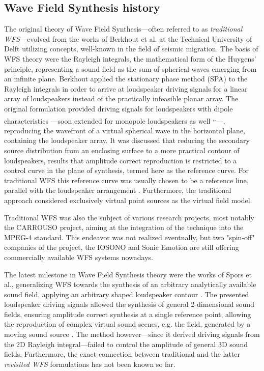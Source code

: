 \documentclass[10pt,twoside]{article}
\theoremstyle{thesisgroupstyle}
\begin{document}
\subsection{Wave Field Synthesis history}
%
The original theory of Wave Field Synthesis---often referred to as \emph{traditional WFS}---evolved from the works of Berkhout et al. at the Technical University of Delft utilizing concepts, well-known in the field of seismic migration.%
The basis of WFS theory were the Rayleigh integrals, the mathematical form of the Huygens' principle, representing a sound field as the sum of spherical waves emerging from an infinite plane.
Berkhout applied the stationary phase method (SPA) to the Rayleigh integrals in order to arrive at loudspeaker driving signals for a linear array of loudspeakers instead of the practically infeasible planar array.
The original formulation provided driving signals for loudspeakers with dipole characteristics ---soon extended for monopole loudspeakers as well \textsuperscript{,}\textsuperscript{,}---, reproducing the wavefront of a virtual spherical wave in the horizontal plane, containing the loudspeaker array.
It was discussed that reducing the secondary source distribution from an enclosing surface to a more practical contour of loudspeakers, results that amplitude correct reproduction is restricted to a control curve in the plane of synthesis, termed here as the reference curve.
For traditional WFS this reference curve was usually chosen to be a reference line, parallel with the loudspeaker arrangement .
Furthermore, the traditional approach considered exclusively virtual point sources as the virtual field model.

Traditional WFS was also the subject of various research projects, most notably the CARROUSO project, aiming at the integration of the technique into the MPEG-4 standard. This endeavor was not realized eventually, but two "spin-off" companies of the project, the IOSONO and Sonic Emotion are still offering commercially available WFS systems nowadays.

The latest milestone in Wave Field Synthesis theory were the works of Spors et al., generalizing WFS towards the synthesis of an arbitrary analytically available sound field, applying an arbitrary shaped loudspeaker contour .
The presented loudspeaker driving signals allowed the synthesis of general 2-dimensional sound fields, ensuring amplitude correct synthesis at a single reference point,
allowing the reproduction of complex virtual sound scenes, e.g. the field, generated by a moving sound source .
The method however---since it derived driving signals from the 2D Rayleigh integral---failed to control the amplitude of general 3D sound fields.
Furthermore, the exact connection between traditional and the latter \emph{revisited WFS} formulations has not been known so far.
\end{document}
